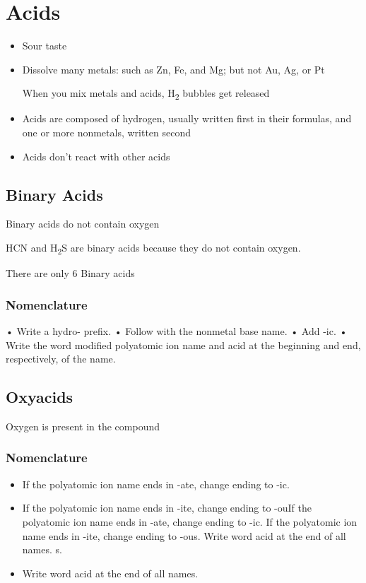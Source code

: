 \documentclass[openany]{book}
\begin{document}
\section{Acids}

\begin{itemize}
	\item Sour taste
	\item Dissolve many metals:
	      such as Zn, Fe, and Mg; but not Au, Ag, or Pt
	      
	      When you mix metals and acids, H\textsubscript{2} bubbles get released
	\item Acids are composed of hydrogen, usually written first in their formulas, and one or more nonmetals, written second
	\item Acids don't react with other acids
\end{itemize}

\subsection{Binary Acids}

Binary acids do not contain oxygen

HCN and H\textsubscript{2}S are binary acids because they do not contain oxygen.

There are only 6 Binary acids

\subsubsection{Nomenclature}

• Write a hydro- prefix.
• Follow with the nonmetal base name.
• Add -ic.
• Write the word modified polyatomic ion name and acid at the beginning and end, respectively, of the name.

\subsection{Oxyacids}

Oxygen is present in the compound

\subsubsection{Nomenclature}

\begin{itemize}
	\item If the polyatomic ion name ends in -ate, change ending to -ic.
	\item If the polyatomic ion name ends in -ite, change ending to -ouIf the polyatomic ion name ends in -ate, change ending to -ic.
	      If the polyatomic ion name ends in -ite, change ending to -ous.
	      Write word acid at the end of all names.
	      s.
	\item Write word acid at the end of all names.
\end{itemize}
\end{document}
